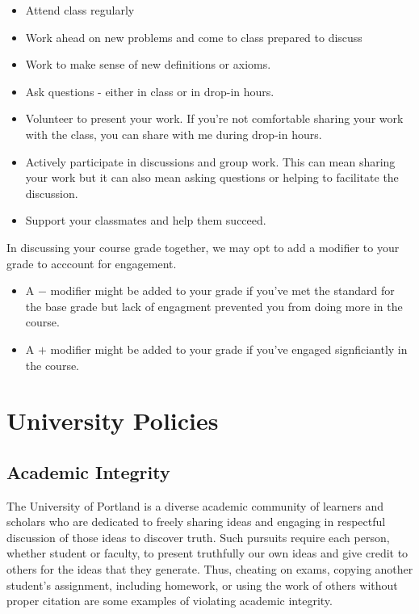 \documentclass[
  letterpaper,
  DIV=11,
  numbers=noendperiod]{scrreprt}
\providecommand{\tightlist}{%
  \setlength{\itemsep}{0pt}\setlength{\parskip}{0pt}}\usepackage{longtable,booktabs,array}
\begin{document}
\begin{itemize}
\tightlist
\item
  Attend class regularly
\item
  Work ahead on new problems and come to class prepared to discuss
\item
  Work to make sense of new definitions or axioms.
\item
  Ask questions - either in class or in drop-in hours.
\item
  Volunteer to present your work. If you're not comfortable sharing your
  work with the class, you can share with me during drop-in hours.
\item
  Actively participate in discussions and group work. This can mean
  sharing your work but it can also mean asking questions or helping to
  facilitate the discussion.
\item
  Support your classmates and help them succeed.
\end{itemize}

In discussing your course grade together, we may opt to add a modifier
to your grade to acccount for engagement.

\begin{itemize}
\item
  A \(\mathbf{-}\) modifier might be added to your grade if you've met
  the standard for the base grade but lack of engagment prevented you
  from doing more in the course.
\item
  A \(\mathbf{+}\) modifier might be added to your grade if you've
  engaged signficiantly in the course.
\end{itemize}


\chapter{University Policies}\label{university-policies}

\section{Academic Integrity}\label{academic-integrity}

The University of Portland is a diverse academic community of learners
and scholars who are dedicated to freely sharing ideas and engaging in
respectful discussion of those ideas to discover truth. Such pursuits
require each person, whether student or faculty, to present truthfully
our own ideas and give credit to others for the ideas that they
generate. Thus, cheating on exams, copying another student's assignment,
including homework, or using the work of others without proper citation
are some examples of violating academic integrity.
\end{document}
